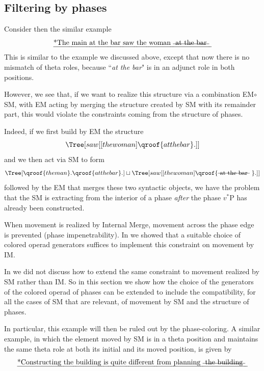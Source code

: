 \documentclass[12pt]{amsart}
\numberwithin{equation}{section}
\begin{document}
\smallskip
\subsection{Filtering by phases}\label{PhaseEMSMsec}

Consider then the similar example 
$$ \text{\em *The main at the bar saw the woman \text{\sout{ at the bar }} } $$
This is similar to the example we discussed above, except that now there is no
mismatch of theta roles, because ``{\em at the bar}" is in an adjunct role in both
positions. 

However, we see that, if we want to realize this structure via a combination EM$\circ$SM,
with EM acting by merging the structure created by SM with its remainder part, this would
violate the constraints coming from the structure of phases. 

Indeed, if we first build by EM the structure
$$ \Tree[ saw [ [ the woman ] \qroof{at the bar}. ] ] $$
and we then act via SM to form
$$ \Tree[ \qroof{the man}. \qroof{at the bar}. ] \sqcup \Tree[ saw [ [ the woman ] \qroof{\text{\sout{ at the bar } }}. ] ] $$
followed by the EM that merges these two syntactic objects, we have the problem that the SM is 
extracting from the interior of a phase {\em after} the phase $v^*$P has already been constructed. 

When movement is realized by Internal Merge, movement across the phase edge is 
prevented (phase impenetrability). In \cite{MHL} we showed that a suitable choice of colored operad
generators suffices to implement this constraint on movement by IM.

In \cite{MHL} we did not discuss how to extend the same constraint to movement realized by SM
rather than IM. So in this section we show how the choice of the generators of the colored operad
of phases can be extended to include the compatibility, for all the cases of SM that are relevant,
of movement by SM and the structure of phases. 

In particular, this example will then be ruled out by the phase-coloring. A similar example,
in which the element moved by SM is in a theta position and maintains the same theta role
at both its initial and its moved position, is given by 
$$ \text{\em *Constructing the building is quite different from planning \text{\sout{ the building }}     } $$
\end{document}
